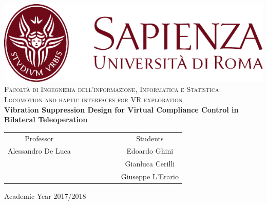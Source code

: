\begin{titlepage}
\begin{center}
	\includegraphics[scale=0.8]{Images/SapienzaLogo} \\
	\vspace{3em}
	{\large \textsc{Facoltà di  Ingegneria dell'informazione, Informatica e Statistica}} \\
	\vspace{2em}
	{\large \textsc{Locomotion and haptic interfaces for VR exploration}} \\
	\doublespacing
	\vspace{5em}
	{\Large \textbf{Vibration Suppression Design for Virtual Compliance Control
			in Bilateral Teleoperation}}
\end{center}

\vskip 2cm
\begin{center}
\begin{tabular}{c c c c c c c c}
	Professor & & & & & & & Students \\[0.2cm]
	\large{Alessandro De Luca} & & & & & & & \large{Edoardo Ghini}\\[0.4cm]
	\large{} & & & & & & & \large{Gianluca Cerilli}\\[0.4cm]
	\large{} & & & & & & & \large{Giuseppe L'Erario}\\[0.4cm]
\end{tabular}
\end{center}

\vskip 1.5cm
\begin{center}
	{\normalsize Academic Year 2017/2018}
\end{center}
\end{titlepage}

\clearpage{\pagestyle{empty}\cleardoublepage}

\vspace{5em}

\onehalfspacing

\clearpage{\pagestyle{empty}\cleardoublepage}
